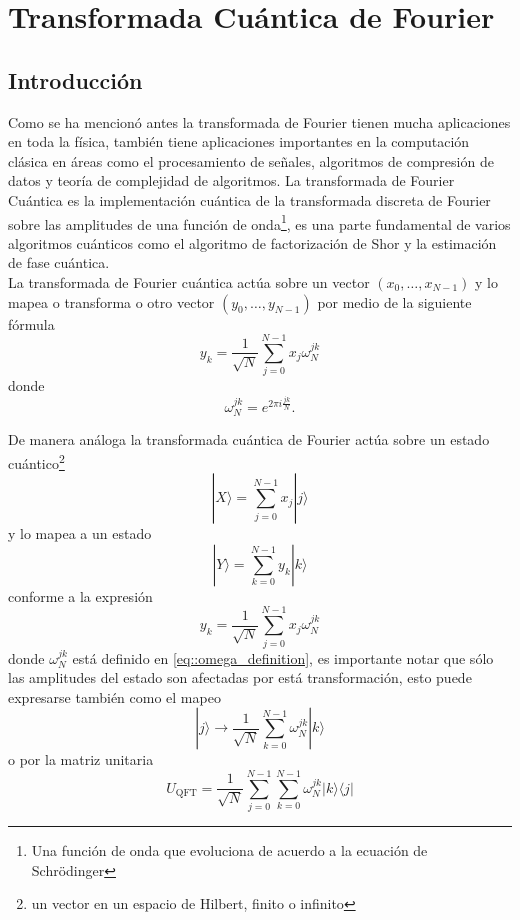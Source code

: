 \documentclass[a4paper]{article}
\begin{document}
\section{Transformada Cuántica de Fourier}
\subsection{Introducción}
Como se ha mencionó antes la transformada de Fourier tienen mucha aplicaciones en toda la física, también tiene aplicaciones importantes en la computación clásica en áreas como el procesamiento de señales, algoritmos de compresión de datos y teoría de complejidad de algoritmos. La transformada de Fourier Cuántica es la implementación cuántica de la transformada discreta de Fourier sobre las amplitudes de una función de onda\footnote{Una función de onda que evoluciona de acuerdo a la ecuación de Schr\"{o}dinger}, es una parte fundamental de varios algoritmos cuánticos  como el algoritmo de factorización de Shor y la estimación de fase cuántica.\\
La transformada de Fourier cuántica actúa sobre un vector $(x_0, \hdots, x_{N-1})$ y lo mapea o transforma o otro vector
$(y_0, \hdots, y_{N-1})$ por medio de la siguiente fórmula
\begin{equation}
y_{k}=\frac{1}{\sqrt{N}}\sum_{j=0}^{N-1}x_j \omega_{N}^{jk}
\end{equation}
donde 
\begin{equation}\label{eq::omega_definition}
\omega_{N}^{jk}=e^{2\pi i \frac{jk}{N}}.
\end{equation}

De manera análoga la transformada cuántica de Fourier actúa sobre un estado cuántico\footnote{un vector en un espacio de Hilbert, finito o infinito} 
\begin{equation}
|X\rangle=\sum_{j=0}^{N-1} x_{j}|j\rangle
\end{equation}
y lo mapea a un estado 
\begin{equation}\label{eq::QFT_general}
|Y\rangle=\sum_{k=0}^{N-1} y_{k}|k\rangle
\end{equation}
conforme a la expresión
\begin{equation}
y_k=\frac{1}{\sqrt{N}}\sum_{j=0}^{N-1}x_j\omega_{N}^{jk}
\end{equation}
donde $\omega_{N}^{jk}$ está definido en \ref{eq::omega_definition}, es importante notar que sólo las amplitudes del estado son afectadas por está transformación, esto puede expresarse también como el mapeo
\begin{equation}
|j\rangle \rightarrow \frac{1}{\sqrt{N}}\sum^{N-1}_{k=0}\omega_N^{jk}|k\rangle
\end{equation}
o por la matriz unitaria
\begin{equation}
U_{\text{QFT}}=\frac{1}{\sqrt{N}}\sum_{j=0}^{N-1}\sum_{k=0}^{N-1}\omega_{N}^{jk}|k\rangle\langle j|
\end{equation}
\end{document}
